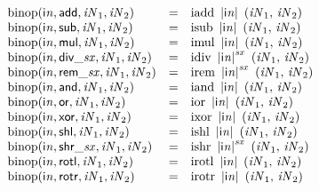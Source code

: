 $$
\begin{array}{@{}lcl@{}l@{}}
{\mathrm{binop}}({\mathsf{i}}{{\mathit{n}}}, \mathsf{add}, {\mathit{iN}}_{{1}}, {\mathit{iN}}_{{2}}) &=& {\mathrm{iadd}}~\,{|{\mathsf{i}}{{\mathit{n}}}|}~\,({\mathit{iN}}_{{1}},\, {\mathit{iN}}_{{2}}) &  \\
{\mathrm{binop}}({\mathsf{i}}{{\mathit{n}}}, \mathsf{sub}, {\mathit{iN}}_{{1}}, {\mathit{iN}}_{{2}}) &=& {\mathrm{isub}}~\,{|{\mathsf{i}}{{\mathit{n}}}|}~\,({\mathit{iN}}_{{1}},\, {\mathit{iN}}_{{2}}) &  \\
{\mathrm{binop}}({\mathsf{i}}{{\mathit{n}}}, \mathsf{mul}, {\mathit{iN}}_{{1}}, {\mathit{iN}}_{{2}}) &=& {\mathrm{imul}}~\,{|{\mathsf{i}}{{\mathit{n}}}|}~\,({\mathit{iN}}_{{1}},\, {\mathit{iN}}_{{2}}) &  \\
{\mathrm{binop}}({\mathsf{i}}{{\mathit{n}}}, {\mathsf{div\_}}{{\mathit{sx}}}, {\mathit{iN}}_{{1}}, {\mathit{iN}}_{{2}}) &=& {\mathrm{idiv}}~\,{{|{\mathsf{i}}{{\mathit{n}}}|}^{{\mathit{sx}}}}~\,({\mathit{iN}}_{{1}},\, {\mathit{iN}}_{{2}}) &  \\
{\mathrm{binop}}({\mathsf{i}}{{\mathit{n}}}, {\mathsf{rem\_}}{{\mathit{sx}}}, {\mathit{iN}}_{{1}}, {\mathit{iN}}_{{2}}) &=& {\mathrm{irem}}~\,{{|{\mathsf{i}}{{\mathit{n}}}|}^{{\mathit{sx}}}}~\,({\mathit{iN}}_{{1}},\, {\mathit{iN}}_{{2}}) &  \\
{\mathrm{binop}}({\mathsf{i}}{{\mathit{n}}}, \mathsf{and}, {\mathit{iN}}_{{1}}, {\mathit{iN}}_{{2}}) &=& {\mathrm{iand}}~\,{|{\mathsf{i}}{{\mathit{n}}}|}~\,({\mathit{iN}}_{{1}},\, {\mathit{iN}}_{{2}}) &  \\
{\mathrm{binop}}({\mathsf{i}}{{\mathit{n}}}, \mathsf{or}, {\mathit{iN}}_{{1}}, {\mathit{iN}}_{{2}}) &=& {\mathrm{ior}}~\,{|{\mathsf{i}}{{\mathit{n}}}|}~\,({\mathit{iN}}_{{1}},\, {\mathit{iN}}_{{2}}) &  \\
{\mathrm{binop}}({\mathsf{i}}{{\mathit{n}}}, \mathsf{xor}, {\mathit{iN}}_{{1}}, {\mathit{iN}}_{{2}}) &=& {\mathrm{ixor}}~\,{|{\mathsf{i}}{{\mathit{n}}}|}~\,({\mathit{iN}}_{{1}},\, {\mathit{iN}}_{{2}}) &  \\
{\mathrm{binop}}({\mathsf{i}}{{\mathit{n}}}, \mathsf{shl}, {\mathit{iN}}_{{1}}, {\mathit{iN}}_{{2}}) &=& {\mathrm{ishl}}~\,{|{\mathsf{i}}{{\mathit{n}}}|}~\,({\mathit{iN}}_{{1}},\, {\mathit{iN}}_{{2}}) &  \\
{\mathrm{binop}}({\mathsf{i}}{{\mathit{n}}}, {\mathsf{shr\_}}{{\mathit{sx}}}, {\mathit{iN}}_{{1}}, {\mathit{iN}}_{{2}}) &=& {\mathrm{ishr}}~\,{{|{\mathsf{i}}{{\mathit{n}}}|}^{{\mathit{sx}}}}~\,({\mathit{iN}}_{{1}},\, {\mathit{iN}}_{{2}}) &  \\
{\mathrm{binop}}({\mathsf{i}}{{\mathit{n}}}, \mathsf{rotl}, {\mathit{iN}}_{{1}}, {\mathit{iN}}_{{2}}) &=& {\mathrm{irotl}}~\,{|{\mathsf{i}}{{\mathit{n}}}|}~\,({\mathit{iN}}_{{1}},\, {\mathit{iN}}_{{2}}) &  \\
{\mathrm{binop}}({\mathsf{i}}{{\mathit{n}}}, \mathsf{rotr}, {\mathit{iN}}_{{1}}, {\mathit{iN}}_{{2}}) &=& {\mathrm{irotr}}~\,{|{\mathsf{i}}{{\mathit{n}}}|}~\,({\mathit{iN}}_{{1}},\, {\mathit{iN}}_{{2}}) &  \\
\end{array}
$$

